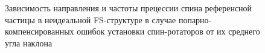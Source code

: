 \begin{figure}[H]
	\centering
\end{figure}
\begin{figure}[H]\centering
	\caption{Зависимость направления и частоты прецессии спина референсной частицы в неидеальной FS-структуре в случае попарно-компенсированных ошибок установки спин-ротаторов от их среднего угла наклона\label{fig:Linearity_test_compensated}}
\end{figure}



